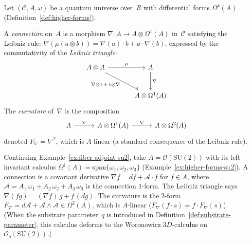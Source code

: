 \begin{definition}
\label{def:categorical-connection}
Let $(\mathcal{C}, A, \omega)$ be a quantum universe over~$R$ with
differential forms $\Omega^k(A)$ (Definition~\ref{def:higher-forms}).

A \emph{connection} on~$A$ is a morphism
$\nabla \colon A \to A \otimes \Omega^1(A)$ in~$\mathcal{C}$ satisfying
the Leibniz rule: $\nabla(\mu(a \otimes b)) =
\nabla(a) \cdot b + a \cdot \nabla(b)$, expressed by the commutativity
of the \emph{Leibniz triangle}:
\begin{equation}\label{eq:leibniz-triangle}
\begin{tikzcd}[row sep=2.5em, column sep=3.5em]
  A \otimes A
    \ar[r, "\mu"]
    \ar[dr, "{\nabla \otimes 1 \,+\, 1 \otimes \nabla}"']
  & A \ar[d, "\nabla"]
  \\
  & A \otimes \Omega^1(A)
\end{tikzcd}
\end{equation}
The \emph{curvature} of~$\nabla$ is the composition
\begin{equation}\label{eq:curvature-composition}
\begin{tikzcd}[column sep=3em]
  A \ar[r, "\nabla"]
  & A \otimes \Omega^1(A) \ar[r, "\nabla"]
  & A \otimes \Omega^2(A)
\end{tikzcd}
\end{equation}
denoted $F_\nabla = \nabla^2$, which is $A$-linear (a standard
consequence of the Leibniz rule).
\end{definition}

\begin{example}
\label{ex:connection-su2}
Continuing Example~\ref{ex:fiber-adjoint-su2}, take
$A = \mathcal{O}(\mathrm{SU}(2))$ with its left-invariant calculus
$\Omega^1(A) = \mathrm{span}\{\omega_1, \omega_2, \omega_3\}$
(Example~\ref{ex:higher-forms-su2}).  A
connection is a covariant derivative
$\nabla f = df + \mathcal{A} \cdot f$ for $f \in A$, where
$\mathcal{A} = A_1\,\omega_1 + A_2\,\omega_2 + A_3\,\omega_3$ is the
connection $1$-form.  The Leibniz triangle says
$\nabla(fg) = (\nabla f)\,g + f\,(dg)$.  The curvature is the $2$-form
$F_\nabla = d\mathcal{A} + \mathcal{A} \wedge \mathcal{A} \in \Omega^2(A)$,
which is $A$-linear ($F_\nabla(f \cdot s) = f \cdot F_\nabla(s)$).
(When the substrate parameter~$q$ is introduced in
Definition~\ref{def:substrate-parameter}, this calculus deforms to the
Woronowicz $3D$-calculus on $\mathcal{O}_q(\mathrm{SU}(2))$.)
\end{example}

